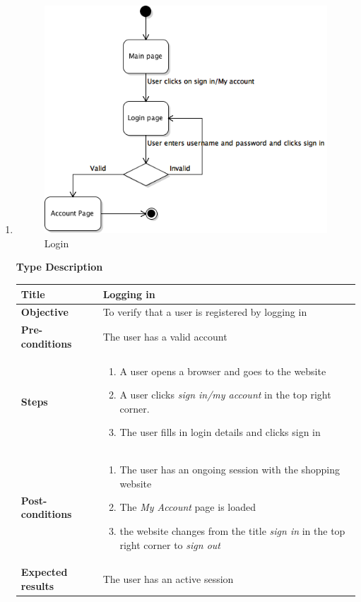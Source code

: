 \documentclass[UKenglish,12pt]{article}
\begin{document}
\begin{enumerate}
\item
\begin{figure}[!h]
\centering
\includegraphics[scale=0.7,keepaspectratio]{Images/Login.png}
\caption{Login}
\end{figure}

\newpage
\textbf{\hspace{0.3cm}Type\hspace{4.4cm} Description}
\newline \vspace{0.2cm}
\begin{tabular}{| p{5cm} | p{10cm} | }
	\hline
	 \textbf{Title} & Logging in\\ \hline
	 \textbf{Objective} & To verify that a user is registered by logging in\\ \hline
	 \textbf{Pre-conditions} & The user has a valid account\\ \hline
	 \textbf{Steps} & \begin{enumerate} \item A user opens a browser and goes to the website \item A user clicks \textit{sign in/my account} in the top right corner. \item The user fills in login details and clicks sign in \end{enumerate} \\ \hline
	 \textbf{Post-conditions} & \begin{enumerate} \item The user has an ongoing session with the shopping website \item The \textit{My Account} page is loaded \item the website changes from the title \textit{sign in} in the top right corner to \textit{sign out} \end{enumerate} \\ \hline
	 \textbf{Expected results} & The user has an active session  \\ 
	 \hline
\end{tabular} %



\end{enumerate}
\end{document}
